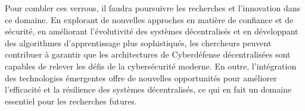 







Pour combler ces verrous, il faudra poursuivre les recherches et l’innovation dans ce domaine. En explorant de nouvelles approches en matière de confiance et de sécurité, en améliorant l’évolutivité des systèmes décentralisés et en développant des algorithmes d’apprentissage plus sophistiqués, les chercheurs peuvent contribuer à garantir que les architectures de Cyberdéfense décentralisées sont capables de relever les défis de la cybersécurité moderne. En outre, l’intégration des technologies émergentes offre de nouvelles opportunités pour améliorer l’efficacité et la résilience des systèmes décentralisés, ce qui en fait un domaine essentiel pour les recherches futures.



